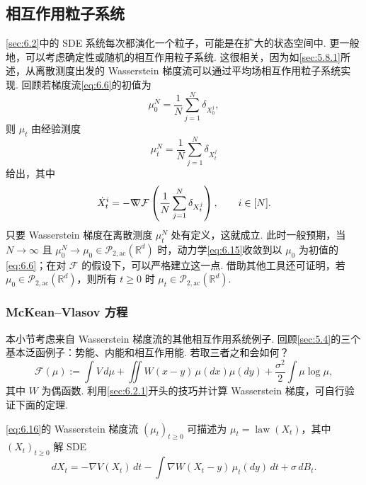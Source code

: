 \subsection{相互作用粒子系统}\label{sec:6.3}

\autoref{sec:6.2}中的 SDE 系统每次都演化一个粒子，可能是在扩大的状态空间中. 更一般地，可以考虑确定性或随机的相互作用粒子系统. 这很相关，因为如\autoref{sec:5.8.1}所述，从离散测度出发的 Wasserstein 梯度流可以通过平均场相互作用粒子系统实现. 回顾若梯度流\eqref{eq:6.6}的初值为
$$
\mu_0^N=\frac1N\sum_{j=1}^N\delta_{X_0^j},
$$
则 $\mu_t$ 由经验测度
$$
\mu_t^N=\frac1N\sum_{j=1}^N\delta_{X_t^j}
$$
给出，其中
\begin{equation}\label{eq:6.15}
\dot X_t^i=-\nabla\mkern-10mu\nabla\mathcal F\left(\frac1N\sum_{j=1}^N\delta_{X_t^j}\right),
\qquad i\in[N].
\end{equation}
只要 Wasserstein 梯度在离散测度 $\mu_t^N$ 处有定义，这就成立. 此时一般预期，当 $N\to\infty$ 且 $\mu_0^N\to\mu_0\in\mathcal P_{2,\mathrm{ac}}(\mathbb R^d)$ 时，动力学\eqref{eq:6.15}收敛到以 $\mu_0$ 为初值的\eqref{eq:6.6}；在对 $\mathcal F$ 的假设下，可以严格建立这一点. 借助其他工具还可证明，若 $\mu_0\in\mathcal P_{2,\mathrm{ac}}(\mathbb R^d)$，则所有 $t\geq0$ 时 $\mu_t\in\mathcal P_{2,\mathrm{ac}}(\mathbb R^d)$.

\subsubsection{McKean--Vlasov 方程}\label{sec:6.3.1}

本小节考虑来自 Wasserstein 梯度流的其他相互作用系统例子. 回顾\autoref{sec:5.4}的三个基本泛函例子：势能、内能和相互作用能. 若取三者之和会如何？
\begin{equation}\label{eq:6.16}
\mathcal F(\mu):=\int V\,d\mu
+\iint W(x-y)\,\mu(dx)\mu(dy)+\frac{\sigma^2}2\int\mu\log\mu,
\end{equation}
其中 $W$ 为偶函数. 利用\autoref{sec:6.2.1}开头的技巧并计算 Wasserstein 梯度，可自行验证下面的定理.

\begin{theorem}\label{thm:6.15}
\eqref{eq:6.16}的 Wasserstein 梯度流 $(\mu_t)_{t\geq0}$ 可描述为 $\mu_t=\operatorname{law}(X_t)$，其中 $(X_t)_{t\geq0}$ 解 SDE
\begin{equation}\label{eq:6.17}
dX_t=-\nabla V(X_t)\,dt-\int\nabla W(X_t-y)\,\mu_t(dy)\,dt+\sigma\,dB_t.
\end{equation}
\end{theorem}

